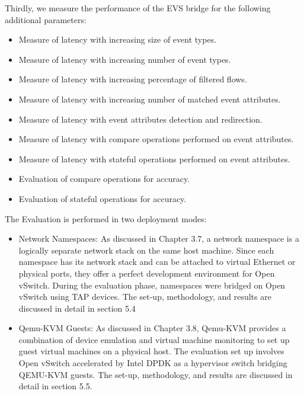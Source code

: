 Thirdly, we measure the performance of the EVS bridge for the following additional parameters:
\begin{itemize}
 \item Measure of latency with increasing size of event types.
 \item Measure of latency with increasing number of event types.
 \item Measure of latency with increasing percentage of filtered flows.
 \item Measure of latency with increasing number of matched event attributes. 
 \item Measure of latency with event attributes detection and redirection.
 \item Measure of latency with compare operations performed on event attributes.
 \item Measure of latency with stateful operations performed on event attributes.
 \item Evaluation of compare operations for accuracy.
 \item Evaluation of stateful operations for accuracy.
\end{itemize}

The Evaluation is performed in two deployment modes:
\begin{itemize}
 \item Network Namespaces: As discussed in Chapter 3.7, a network namespace is a logically separate network stack on the same host machine. Since each namespace has its network stack and can be attached to virtual Ethernet or physical ports, they offer a perfect development environment for Open vSwitch. During the evaluation phase, namespaces were bridged on Open vSwitch using TAP devices. The set-up, methodology, and results are discussed in detail in section 5.4
 \item Qemu-KVM Guests: As discussed in Chapter 3.8, Qemu-KVM provides a combination of device emulation and virtual machine monitoring to set up guest virtual machines on a physical host. The evaluation set up involves Open vSwitch accelerated by Intel DPDK as a hypervisor switch bridging QEMU-KVM guests. The set-up, methodology, and results are discussed in detail in section 5.5.
\end{itemize}


